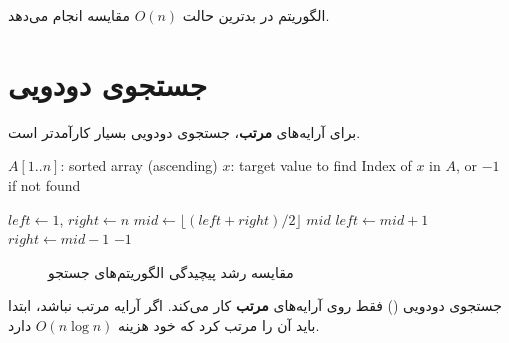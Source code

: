 \documentclass{matinbook}
\begin{document}
\begin{theorem}
    الگوریتم  در بدترین حالت
    $O(n)$ مقایسه انجام می‌دهد.
    \label{thm:linear-complexity}
\end{theorem}

\section{جستجوی دودویی}

برای آرایه‌های \textbf{مرتب}،
جستجوی دودویی
بسیار کارآمدتر است.

\begin{latin}
\begin{algorithm}
\begin{algorithmic}[1]
    \Require $A[1..n]$: sorted array (ascending)
    \Require $x$: target value to find
    \Ensure Index of $x$ in $A$, or $-1$ if not found
    
    \State $left \gets 1$, $right \gets n$
        \State $mid \gets \lfloor (left + right) / 2 \rfloor$
            \State \Return $mid$
            \State $left \gets mid + 1$
        \Else
            \State $right \gets mid - 1$
        \EndIf
    \EndWhile
    \State \Return $-1$
\end{algorithmic}
\end{algorithm}
\end{latin}

\begin{figure}[h]
\centering
\begin{latin}
\end{latin}
\caption{مقایسه رشد پیچیدگی الگوریتم‌های جستجو}
\label{fig:search-comparison}
\end{figure}

\begin{remark}
    جستجوی دودویی ()
    فقط روی آرایه‌های \textbf{مرتب} کار می‌کند.
    اگر آرایه مرتب نباشد، ابتدا باید آن را
    مرتب کرد که خود هزینه $O(n \log n)$ دارد.
    \label{rem:binary-requirement}
\end{remark}
\end{document}
